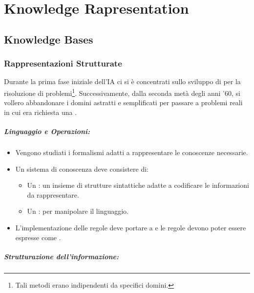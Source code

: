 \chapter{Knowledge Rapresentation}

\section{Knowledge Bases}

\subsection{Rappresentazioni Strutturate}

Durante la prima fase iniziale dell'IA ci si è concentrati sullo sviluppo di  per la risoluzione di problemi\footnote{Tali metodi erano indipendenti da specifici domini.}. Successivamente, dalla seconda metà degli anni '60, si vollero abbandonare i domini astratti e semplificati per passare a problemi reali in cui era richiesta una .

\paragraph{Linguaggio e Operazioni:}

\begin{itemize}
  \item Vengono studiati i formalismi adatti a rappresentare le conoscenze necessarie. 
  \item Un sistema di conoscenza deve consistere di:
    \begin{itemize}
      \item Un : un insieme di strutture sintattiche adatte a codificare le informazioni da rappresentare. 
      \item Un : per manipolare il linguaggio.  
    \end{itemize}
  \item L'implementazione delle regole deve portare a  e le regole devono poter essere espresse come .
\end{itemize}

\paragraph{Strutturazione dell'informazione:}

